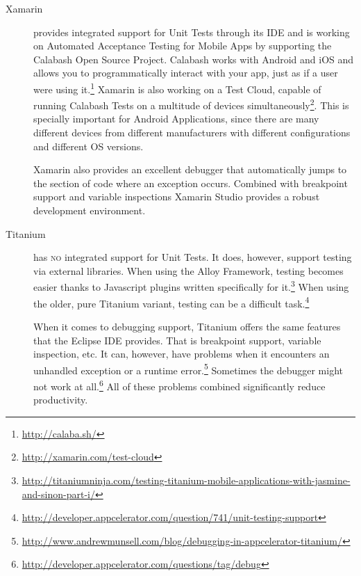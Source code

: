 \begin{description}
\item[Xamarin] provides integrated support for Unit Tests through its \ac{IDE} and is working on Automated Acceptance Testing for Mobile Apps by supporting the Calabash Open Source Project. Calabash works with Android and iOS and allows you to programmatically interact with your app, just as if a user were using it.\footnote{\url{http://calaba.sh/}} Xamarin is also working on a Test Cloud, capable of running Calabash Tests on a multitude of devices simultaneously\footnote{\url{http://xamarin.com/test-cloud}}. This is specially important for Android Applications, since there are many different devices from different manufacturers with different configurations and different \ac{OS} versions.

Xamarin also provides an excellent debugger that automatically jumps to the section of code where an exception occurs. Combined with breakpoint support and variable inspections Xamarin Studio provides a robust development environment.

\item[Titanium] has \textsc{no} integrated support for Unit Tests. It does, however, support testing via external libraries. When using the Alloy Framework, testing becomes easier thanks to Javascript plugins written specifically for it.\footnote{\url{http://titaniumninja.com/testing-titanium-mobile-applications-with-jasmine-and-sinon-part-i/}} When using the older, pure Titanium variant, testing can be a difficult task.\footnote{\url{http://developer.appcelerator.com/question/741/unit-testing-support}}

When it comes to debugging support, Titanium offers the same features that the Eclipse \ac{IDE} provides. That is breakpoint support, variable inspection, etc. It can, however, have problems when it encounters an unhandled exception or a runtime error.\footnote{\url{http://www.andrewmunsell.com/blog/debugging-in-appcelerator-titanium/}} Sometimes the debugger might not work at all.\footnote{\url{http://developer.appcelerator.com/questions/tag/debug}} All of these problems combined significantly reduce productivity.    
\end{description}

